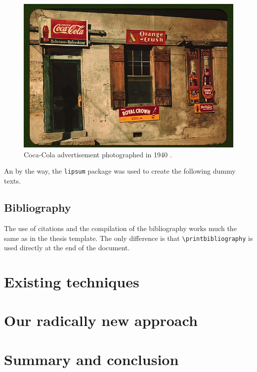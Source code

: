 \documentclass[a4paper,twocolumn,english,11pt]{article}
\begin{document}
\begin{figure}
\centering
\includegraphics[width=1.0\columnwidth]{cola-public-domain-photo-p}
\caption{Coca-Cola advertisement photographed in 1940 \cite{CocaCola1940}.}
\label{fig:CocaCola}
\end{figure}

An by the way, the \texttt{lipsum} package was used to create the following
dummy texts. 

\subsection{Bibliography}

The use of citations and the compilation of the bibliography works much the same
as in the thesis template. 
The only difference is that \verb!\printbibliography! is used directly at the end
of the document.

\section{Existing techniques}
\lipsum[2-4]


\section{Our radically new approach}
\lipsum[5-7]

\section{Summary and conclusion}
\lipsum[8-9]




  
\printbibliography  %

\end{document}
